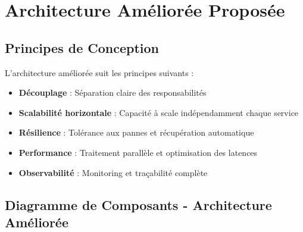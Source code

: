 \documentclass[12pt,a4paper]{article}
\begin{document}
\section{Architecture Améliorée Proposée}

\subsection{Principes de Conception}

L'architecture améliorée suit les principes suivants :

\begin{itemize}
    \item \textbf{Découplage} : Séparation claire des responsabilités
    \item \textbf{Scalabilité horizontale} : Capacité à scale indépendamment chaque service
    \item \textbf{Résilience} : Tolérance aux pannes et récupération automatique
    \item \textbf{Performance} : Traitement parallèle et optimisation des latences
    \item \textbf{Observabilité} : Monitoring et traçabilité complète
\end{itemize}

\subsection{Diagramme de Composants - Architecture Améliorée}
\end{document}
